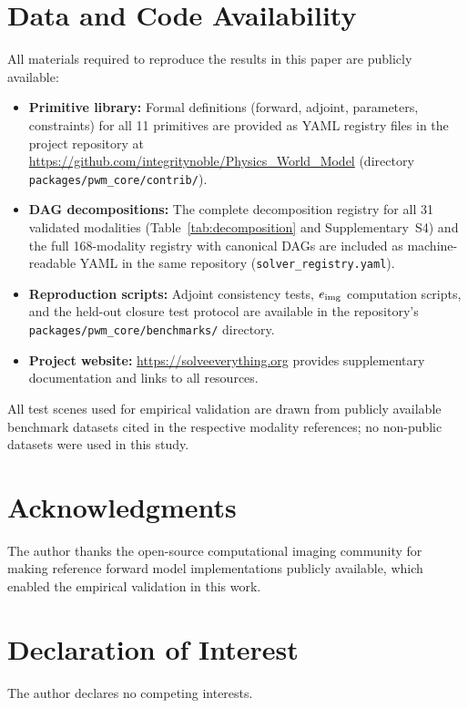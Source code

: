 \documentclass[11pt]{article}
\begin{document}
\section*{Data and Code Availability}

All materials required to reproduce the results in this paper are publicly available:
\begin{itemize}
  \item \textbf{Primitive library:} Formal definitions (forward, adjoint, parameters, constraints) for all 11 primitives are provided as YAML registry files in the project repository at \url{https://github.com/integritynoble/Physics_World_Model} (directory \texttt{packages/pwm\_core/contrib/}).
  \item \textbf{DAG decompositions:} The complete decomposition registry for all 31 validated modalities (Table~\ref{tab:decomposition} and Supplementary~S4) and the full 168-modality registry with canonical DAGs are included as machine-readable YAML in the same repository (\texttt{solver\_registry.yaml}).
  \item \textbf{Reproduction scripts:} Adjoint consistency tests, $e_{\mathrm{img}}$ computation scripts, and the held-out closure test protocol are available in the repository's \texttt{packages/pwm\_core/benchmarks/} directory.
  \item \textbf{Project website:} \url{https://solveeverything.org} provides supplementary documentation and links to all resources.
\end{itemize}
All test scenes used for empirical validation are drawn from publicly available benchmark datasets cited in the respective modality references; no non-public datasets were used in this study.


\section*{Acknowledgments}
The author thanks the open-source computational imaging community for making reference forward model implementations publicly available, which enabled the empirical validation in this work.

\section*{Declaration of Interest}
The author declares no competing interests.
\end{document}
